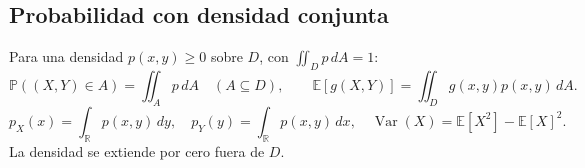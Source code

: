 \subsection*{Probabilidad con densidad conjunta}
Para una densidad $p(x,y)\geq0$ sobre $D$, con $\iint_Dp\,dA=1$:
\[
\mathbb P((X,Y)\in A)=\iint_Ap\,dA\quad(A\subseteq D),\qquad
\mathbb E[g(X,Y)]=\iint_D g(x,y)p(x,y)\,dA.
\]
\[
p_X(x)=\int_{\mathbb R}p(x,y)\,dy,\quad
p_Y(y)=\int_{\mathbb R}p(x,y)\,dx,\quad
\operatorname{Var}(X)=\mathbb E[X^2]-\mathbb E[X]^2.
\]
La densidad se extiende por cero fuera de $D$.
\endgroup
